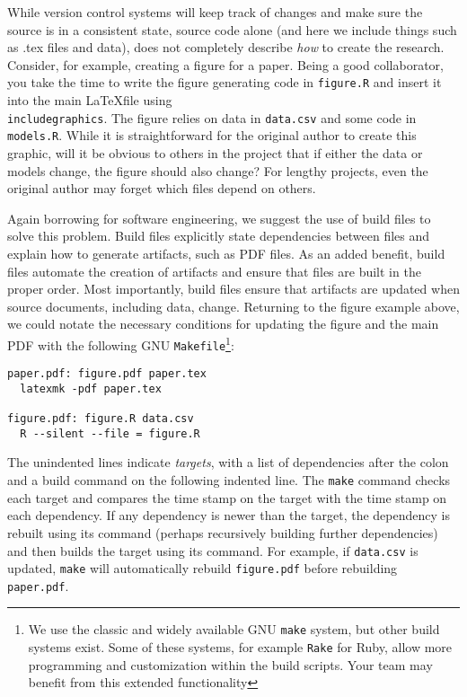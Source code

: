 \documentclass[]{article}
\begin{document}
While version control systems will keep track of changes and make sure the
source is in a consistent state,  %
source code alone (and here we include things such as .tex files and data),
does not completely describe \emph{how} to create the research. Consider, for
example, creating a figure for a paper. Being a good collaborator, you take
the time to write the figure generating code in \texttt{figure.R} and insert
it into the main \LaTeX file using
\texttt{\\includegraphics}. The figure relies on data in \texttt{data.csv} and
some code in \texttt{models.R}. While it is straightforward for the original
author to create this graphic, will it be obvious to others in the project
that if either the data or models change, the figure should also change? For
lengthy projects, even the original author may forget which files depend on
others.

Again borrowing for software engineering, we suggest the use of build files to
solve this problem. Build files explicitly state dependencies between files
and explain how to generate artifacts, such as PDF files. As an added benefit,
build files automate the creation of artifacts and ensure that files are built
in the proper order. Most importantly, build files ensure that artifacts are
updated when source documents, including data, change. Returning to the figure
example above, we could notate the necessary conditions for updating the
figure and the main PDF with the following GNU \texttt{Makefile}\footnote{We
use the classic and widely available GNU \texttt{make} system, but other build
systems exist. Some of these systems, for example \texttt{Rake} for Ruby,
allow more programming and customization within the build scripts. Your team
may benefit from this extended functionality}:

\begin{verbatim}
paper.pdf: figure.pdf paper.tex
  latexmk -pdf paper.tex

figure.pdf: figure.R data.csv
  R --silent --file = figure.R
\end{verbatim}

The unindented lines indicate \emph{targets}, with a list of dependencies
after the colon and a build command on the following indented line.
The \texttt{make} command checks each target and compares the
time stamp on the target with the time stamp on each dependency. If any
dependency is newer than the target, the dependency is rebuilt using its
command (perhaps recursively building further dependencies) and then builds
the target using its command. For example, if \texttt{data.csv} is updated,
\texttt{make} will automatically rebuild \texttt{figure.pdf} before rebuilding
\texttt{paper.pdf}.
\end{document}
